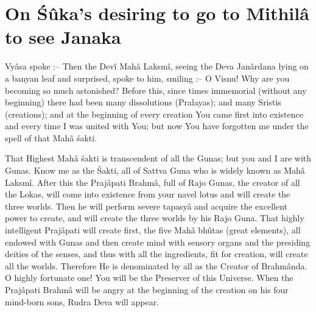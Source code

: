 \chapter{On \'S\^uka’s desiring to go to Mithil\^a to see Janaka}

Vy\^asa spoke :-- Then the Dev\^i Mah\^a Laksm\^i, seeing the Deva Jan\^ardana lying on a banyan leaf and surprised, spoke to him, smiling :-- O Visnu! Why are you becoming so much astonished? Before this, since times immemorial (without any beginning) there had been many dissolutions (Pralayas); and many Sristis (creations); and at the beginning of every creation You came first into existence and every time I was united with You; but now You have forgotten me under the spell of that Mah\^a \'sakti.

That Highest Mah\^a \'sakti is transcendent of all the Gunas; but you and I are with Gunas. Know me as the \'Sakti, all of Sattva Guna who is widely known as Mah\^a Laksm\^i. After this the Praj\^apati Brahm\^a, full of Rajo Gunas, the creator of all the Lokas, will come into existence from your navel lotus and will create the three worlds. Then he will perform severe tapasy\^a and acquire the excellent power to create, and will create the three worlds by his Rajo Guna. That highly intelligent Praj\^apati will create first, the five Mah\^a bh\^utas (great elements), all endowed with Gunas and then create mind with sensory organs and the presiding deities of the senses, and thus with all the ingredients, fit for creation, will create all the worlds. Therefore He is denominated by all as the Creator of Brahm\^anda. O highly fortunate one! You will be the Preserver of this Universe. When the Praj\^apati Brahm\^a will be angry at the beginning of the creation on his four mind-born sons, Rudra Deva will appear.

